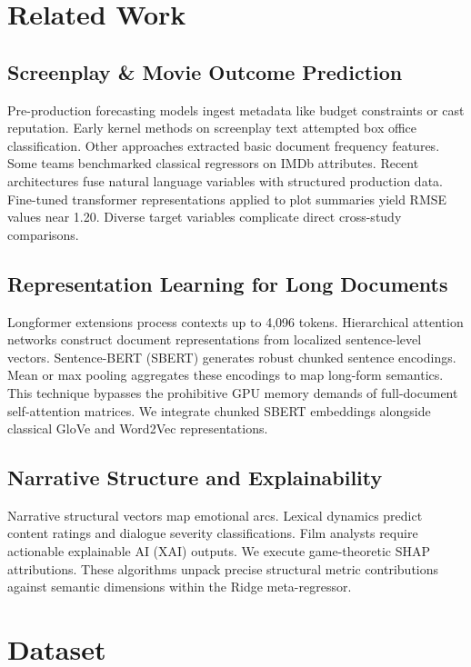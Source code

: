 \documentclass[conference]{IEEEtran}
\begin{document}
\section{Related Work}

\subsection{Screenplay \& Movie Outcome Prediction}
Pre-production forecasting models ingest metadata like budget constraints or cast reputation. Early kernel methods on screenplay text attempted box office classification. Other approaches extracted basic document frequency features. Some teams benchmarked classical regressors on IMDb attributes. Recent architectures fuse natural language variables with structured production data. Fine-tuned transformer representations applied to plot summaries yield RMSE values near 1.20. Diverse target variables complicate direct cross-study comparisons.

\subsection{Representation Learning for Long Documents}
Longformer extensions process contexts up to 4,096 tokens. Hierarchical attention networks construct document representations from localized sentence-level vectors. Sentence-BERT (SBERT) generates robust chunked sentence encodings. Mean or max pooling aggregates these encodings to map long-form semantics. This technique bypasses the prohibitive GPU memory demands of full-document self-attention matrices. We integrate chunked SBERT embeddings alongside classical GloVe and Word2Vec representations.

\subsection{Narrative Structure and Explainability}
Narrative structural vectors map emotional arcs. Lexical dynamics predict content ratings and dialogue severity classifications. Film analysts require actionable explainable AI (XAI) outputs. We execute game-theoretic SHAP attributions. These algorithms unpack precise structural metric contributions against semantic dimensions within the Ridge meta-regressor.

\section{Dataset}
\end{document}
